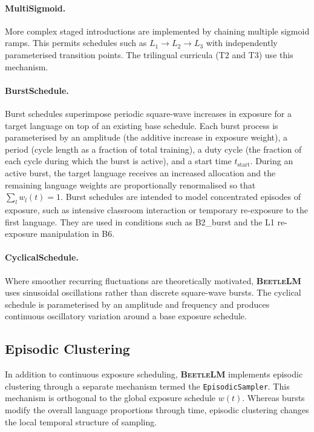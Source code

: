 \documentclass[11pt]{article}
\newcommand{\beetlelm}{\textsc{\textbf{BeetleLM}}}
\begin{document}
\paragraph{MultiSigmoid.}
More complex staged introductions are implemented by chaining multiple sigmoid
ramps. This permits schedules such as
\(
L_1 \rightarrow L_2 \rightarrow L_3
\)
with independently parameterised transition points. The trilingual curricula
(T2 and T3) use this mechanism.

\paragraph{BurstSchedule.}
Burst schedules superimpose periodic square-wave increases in exposure for a
target language on top of an existing base schedule. Each burst process is
parameterised by an amplitude (the additive increase in exposure weight), a
period (cycle length as a fraction of total training), a duty cycle (the
fraction of each cycle during which the burst is active), and a start time
\(t_{\mathrm{start}}\). During an active burst, the target language receives an
increased allocation and the remaining language weights are proportionally
renormalised so that
\(
\sum_l w_l(t)=1.
\)
Burst schedules are intended to model concentrated episodes of exposure, such
as intensive classroom interaction or temporary re-exposure to the first
language. They are used in conditions such as B2\_burst and the L1
re-exposure manipulation in B6.

\paragraph{CyclicalSchedule.}
Where smoother recurring fluctuations are theoretically motivated, \beetlelm{}
uses sinusoidal oscillations rather than discrete square-wave bursts. The
cyclical schedule is parameterised by an amplitude and frequency and produces
continuous oscillatory variation around a base exposure schedule.

\subsection{Episodic Clustering}
\label{app:episodic}

In addition to continuous exposure scheduling, \beetlelm{} implements episodic
clustering through a separate mechanism termed the \texttt{EpisodicSampler}.
This mechanism is orthogonal to the global exposure schedule \(w(t)\). Whereas
bursts modify the overall language proportions through time, episodic
clustering changes the local temporal structure of sampling.
\end{document}
